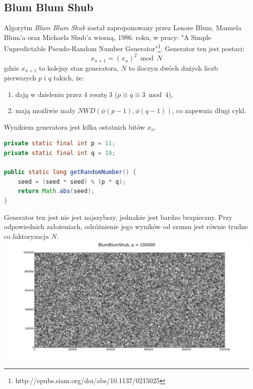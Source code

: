 \documentclass[a4paper, 11pt]{article} %
\begin{document}
\subsection{Blum Blum Shub}
Algorytm \textit{Blum Blum Shub} został zaproponowany przez Lenore Blum, Manuela Blum'a oraz Michaela Shub'a wiosną, 1986. roku, w pracy: "A Simple Unpredictable Pseudo-Random Number Generator"\footnote{http://epubs.siam.org/doi/abs/10.1137/0215025}. Generator ten jest postaci:
\[ x_{n+1} = (x_{n})^2 \bmod N \]
gdzie $x_{n+1}$ to kolejny stan generatora, $N$ to iloczyn dwóch dużych liczb pierwszych $p$ i $q$ takich, że:
\begin{enumerate}
\item dają w dzieleniu przez 4 resztę 3 ($p\equiv q \equiv 3 \bmod 4$),
\item mają możliwie mały $NWD(\phi(p-1), \phi(q-1))$, co zapewnia długi cykl.
\end{enumerate}
Wynikiem generatora jest kilka ostatnich bitów $x_{n}$.
\begin{lstlisting}[style=mystyle, language=java, frame=single, caption = Generowanie następnej liczby pseudolosowej przez BBS]
private static final int p = 11;
private static final int q = 19;

public static long getRandomNumber() {
    seed = (seed * seed) % (p * q);
    return Math.abs(seed);
}
\end{lstlisting}
Generator ten jest nie jest najszybszy, jednakże jest bardzo bezpieczny. Przy odpowiednich założeniach, odróżnienie jego wyników od szumu jest równie trudne co faktoryzacja $N$.\\
\includegraphics[width=\linewidth]{img/bbs-1.png}
\end{document}
